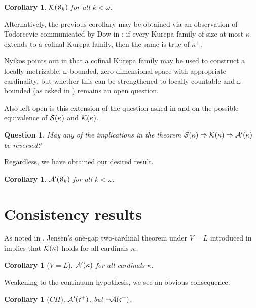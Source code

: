 \documentclass{amsart}
\theoremstyle{plain}
\newtheorem{corollary}[theorem]{Corollary}
\newtheorem{question}[theorem]{Question}
\theoremstyle{definition}
\theoremstyle{remark}
\theoremstyle{plain}
\theoremstyle{definition}
\theoremstyle{remark}
\begin{document}
  \begin{corollary}
    \(\mathcal{K}(\aleph_k)\) for all \(k<\omega\).
  \end{corollary}

  Alternatively, the previous corollary may be obtained
  via an observation of Todorcevic
  communicated by Dow in \cite{MR1229125}:
  if every Kurepa family of size at most \(\kappa\)
  extends to a cofinal Kurepa family, then the same is true of \(\kappa^+\).

  Nyikos points out in \cite{NYIKOSKUREPA} that a cofinal Kurepa family may
  be used to construct a locally metrizable, \(\omega\)-bounded,
  zero-dimensional space with appropriate cardinality,
  but whether this can be
  strengthened to locally countable and \(\omega\)-bounded (as asked in
  \cite{MR539228}) remains an open question.

  Also left open is this extension of the question asked in \cite{NYIKOSKUREPA}
  and \cite{MR539228} on the possible equivalence of \(\mathcal{S}(\kappa)\)
  and \(\mathcal{K}(\kappa)\).

  \begin{question}
    May any of the implications in the theorem
    \(\mathcal{S}(\kappa)\Rightarrow\mathcal{K}(\kappa)\Rightarrow\mathcal{A}'(\kappa)\)
    be reversed?
  \end{question}

  Regardless, we have obtained our desired result.

  \begin{corollary}
    \(\mathcal{A}'(\aleph_k)\) for all \(k<\omega\).
  \end{corollary}




  \section{Consistency results}

  As noted in \cite{MR1229125}, Jensen's one-gap two-cardinal theorem under
  \(V=L\) introduced in \cite{MR0309729} implies that \(\mathcal{K}(\kappa)\)
  holds for all cardinals \(\kappa\).

  \begin{corollary}[\(V=L\)]\label{alcompSPunderV=L}
    \(\mathcal{A}'(\kappa)\) for all cardinals \(\kappa\).
  \end{corollary}

  Weakening to the continuum hypothesis, we see an obvious consequence.

  \begin{corollary}[\(CH\)]
    \(\mathcal{A}'(\mathfrak{c}^+)\), but \(\neg\mathcal{A}(\mathfrak{c}^+)\).
  \end{corollary}
\end{document}
